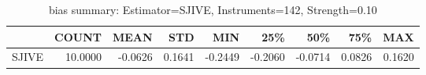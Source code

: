 \begin{table}[ht]
\centering
\caption{bias summary: Estimator=SJIVE, Instruments=142, Strength=0.10}
\begin{tabular}{lrrrrrrrr}
\toprule
 & COUNT & MEAN & STD & MIN & 25\% & 50\% & 75\% & MAX \\
\midrule
SJIVE & 10.0000 & -0.0626 & 0.1641 & -0.2449 & -0.2060 & -0.0714 & 0.0826 & 0.1620 \\
\bottomrule
\end{tabular}
\end{table}
